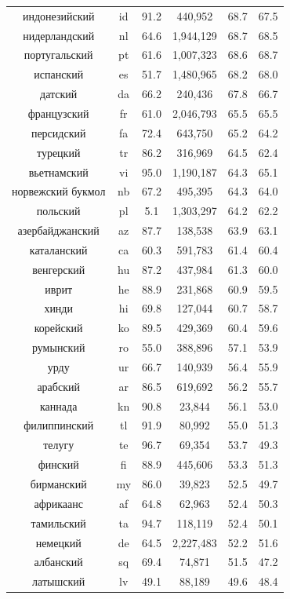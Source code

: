 \begin{table}
{\begin{tabular}{|c|c|c||c|c|c|}
индонезийский & id & 91.2 & 440,952 & 68.7 & 67.5\\
нидерландский & nl & 64.6 & 1,944,129 & 68.7 & 68.5\\
португальский & pt & 61.6 & 1,007,323 & 68.6 & 68.7\\
испанский & es & 51.7 & 1,480,965 & 68.2 & 68.0\\
датский & da & 66.2 & 240,436 & 67.8 & 66.7\\
французский & fr & 61.0 & 2,046,793 & 65.5 & 65.5\\
персидский & fa & 72.4 & 643,750 & 65.2 & 64.2\\
турецкий & tr & 86.2 & 316,969 & 64.5 & 62.4\\
вьетнамский & vi & 95.0 & 1,190,187 & 64.3 & 65.1\\
норвежский букмол & nb & 67.2 & 495,395 & 64.3 & 64.0\\
польский & pl & 5.1 & 1,303,297 & 64.2 & 62.2\\
азербайджанский & az & 87.7 & 138,538 & 63.9 & 63.1\\
каталанский & ca & 60.3 & 591,783 & 61.4 & 60.4\\
венгерский & hu & 87.2 & 437,984 & 61.3 & 60.0\\
иврит & he & 88.9 & 231,868 & 60.9 & 59.5\\
хинди & hi & 69.8 & 127,044 & 60.7 & 58.7\\
корейский & ko & 89.5 & 429,369 & 60.4 & 59.6\\
румынский & ro & 55.0 & 388,896 & 57.1 & 53.9\\
урду & ur & 66.7 & 140,939 & 56.4 & 55.9\\
арабский & ar & 86.5 & 619,692 & 56.2 & 55.7\\
каннада & kn & 90.8 & 23,844 & 56.1 & 53.0\\
филиппинский & tl & 91.9 & 80,992 & 55.0 & 51.3\\
телугу & te & 96.7 & 69,354 & 53.7 & 49.3\\
финский & fi & 88.9 & 445,606 & 53.3 & 51.3\\
бирманский & my & 86.0 & 39,823 & 52.5 & 49.7\\
африкаанс & af & 64.8 & 62,963 & 52.4 & 50.3\\
тамильский & ta & 94.7 & 118,119 & 52.4 & 50.1\\
немецкий & de & 64.5 & 2,227,483 & 52.2 & 51.6\\
албанский & sq & 69.4 & 74,871 & 51.5 & 47.2\\
латышский & lv & 49.1 & 88,189 & 49.6 & 48.4\\

\end{tabular}}
\end{table}
